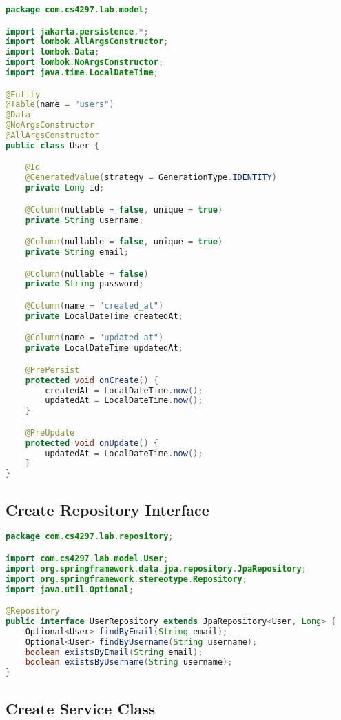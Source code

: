 \documentclass[12pt,a4paper]{article}
\begin{document}
\begin{lstlisting}[language=java, caption=User.java - JPA Entity]
package com.cs4297.lab.model;

import jakarta.persistence.*;
import lombok.AllArgsConstructor;
import lombok.Data;
import lombok.NoArgsConstructor;
import java.time.LocalDateTime;

@Entity
@Table(name = "users")
@Data
@NoArgsConstructor
@AllArgsConstructor
public class User {

    @Id
    @GeneratedValue(strategy = GenerationType.IDENTITY)
    private Long id;

    @Column(nullable = false, unique = true)
    private String username;

    @Column(nullable = false, unique = true)
    private String email;

    @Column(nullable = false)
    private String password;

    @Column(name = "created_at")
    private LocalDateTime createdAt;

    @Column(name = "updated_at")
    private LocalDateTime updatedAt;

    @PrePersist
    protected void onCreate() {
        createdAt = LocalDateTime.now();
        updatedAt = LocalDateTime.now();
    }

    @PreUpdate
    protected void onUpdate() {
        updatedAt = LocalDateTime.now();
    }
}
\end{lstlisting}

\subsection{Create Repository Interface}

\begin{lstlisting}[language=java, caption=UserRepository.java - Spring Data JPA Repository]
package com.cs4297.lab.repository;

import com.cs4297.lab.model.User;
import org.springframework.data.jpa.repository.JpaRepository;
import org.springframework.stereotype.Repository;
import java.util.Optional;

@Repository
public interface UserRepository extends JpaRepository<User, Long> {
    Optional<User> findByEmail(String email);
    Optional<User> findByUsername(String username);
    boolean existsByEmail(String email);
    boolean existsByUsername(String username);
}
\end{lstlisting}

\subsection{Create Service Class}
\end{document}
